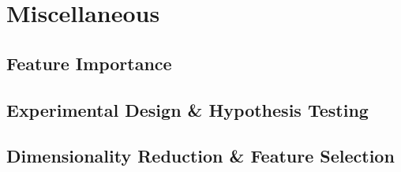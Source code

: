 \chapter{Miscellaneous}
\label{chap:misc}

\section{Feature Importance}
\label{misc:feature_importance}

\section{Experimental Design \& Hypothesis Testing}
\label{misc:exp_design}

\section{Dimensionality Reduction \& Feature Selection}
\label{misc:m_reduction}
